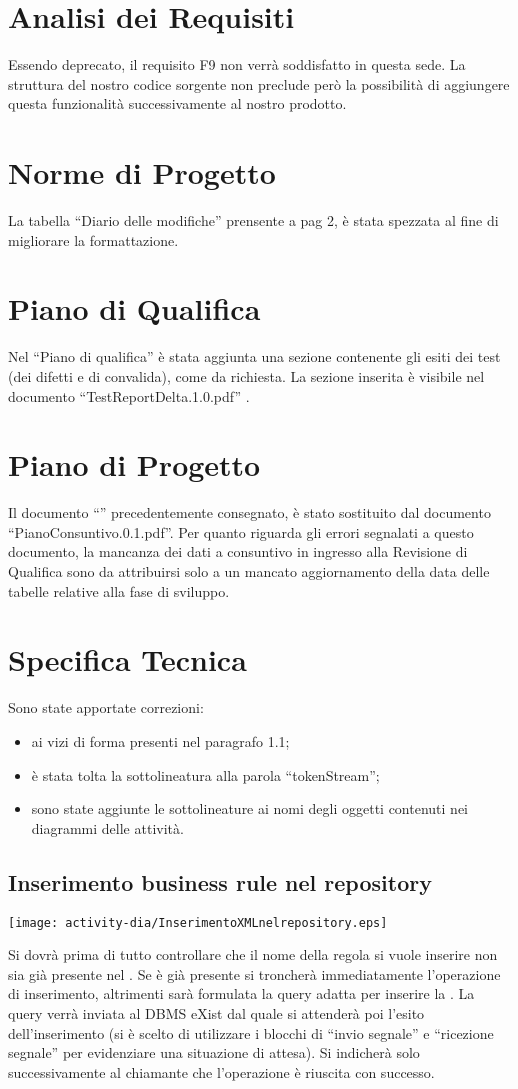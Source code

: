 \chapter{Analisi dei Requisiti}
Essendo deprecato, il requisito F9 non verr\`a soddisfatto in questa sede. La struttura del nostro codice sorgente non preclude per\`o la possibilit\`a di aggiungere questa funzionalit\`a successivamente al nostro prodotto.
\chapter{Norme di Progetto}
La tabella ``Diario delle modifiche'' prensente a pag 2, \`e stata spezzata al fine di migliorare la formattazione.
\chapter{Piano di Qualifica}
Nel ``Piano di qualifica'' \`e stata aggiunta una sezione contenente gli esiti dei test (dei difetti e di convalida), come da richiesta. La sezione inserita \`e visibile nel documento ``TestReportDelta.1.0.pdf'' .


\chapter{Piano di Progetto}
Il documento ``\PdP'' precedentemente consegnato, \`e stato sostituito dal documento ``PianoConsuntivo.0.1.pdf''.
Per quanto riguarda gli errori segnalati a questo documento, la mancanza dei dati a consuntivo in ingresso alla Revisione di Qualifica sono da attribuirsi solo a un mancato aggiornamento della data delle tabelle relative alla fase di sviluppo. 
\chapter{Specifica Tecnica}
Sono state apportate correzioni:
\begin{itemize}
\item ai vizi di forma presenti nel paragrafo 1.1;
\item \`e stata tolta la sottolineatura alla parola ``tokenStream'';
\item sono state aggiunte le sottolineature ai nomi degli oggetti contenuti nei diagrammi delle attivit\`a.
\end{itemize}
\begin{center} 
\section{Inserimento business rule nel repository}
\texttt{[image: activity-dia/InserimentoXMLnelrepository.eps]}
\end{center}
Si dovr\`a prima di tutto controllare che il nome della regola si vuole inserire non sia gi\`a presente nel \rp. Se \`e gi\`a presente si troncher\`a immediatamente l'operazione di inserimento, altrimenti sar\`a formulata la query adatta per inserire la \br . La query verr\`a inviata al DBMS eXist dal quale si attender\`a poi l'esito dell'inserimento (si \`e scelto di utilizzare i blocchi di ``invio segnale'' e ``ricezione segnale'' per evidenziare una situazione di attesa). Si indicher\`a solo successivamente al chiamante che l'operazione \`e riuscita con successo.
